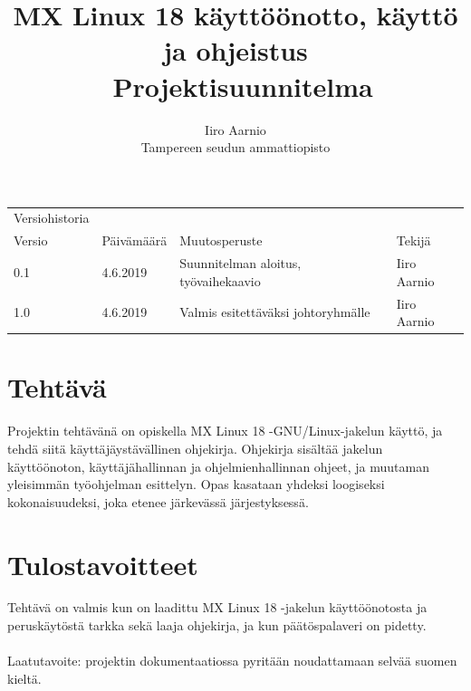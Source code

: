 \documentclass[a4paper, 12pt, finnish]{article}
\begin{document}
\title{MX Linux 18 käyttöönotto, käyttö ja ohjeistus \\ \large Projektisuunnitelma}
\author{Iiro Aarnio\\ Tampereen seudun ammattiopisto}
\maketitle
\thispagestyle{empty}
\newpage
\thispagestyle{empty}
\newpage
\begin{table}[htpb]
\begin{tabular}{llll}
Versiohistoria &            &                         &             \\
\rowcolor[HTML]{FFCCC9}
Versio         & Päivämäärä & Muutosperuste           & Tekijä      \\
0.1              & 4.6.2019   & Suunnitelman aloitus, työvaihekaavio       & Iiro Aarnio \\
1.0 & 4.6.2019 & Valmis esitettäväksi johtoryhmälle & Iiro Aarnio \\
\end{tabular}
\end{table}

\newpage
\thispagestyle{empty}
\tableofcontents
\newpage
\section{Tehtävä}
Projektin tehtävänä on opiskella MX Linux 18 -GNU/Linux-jakelun käyttö, ja tehdä siitä käyttäjäystävällinen ohjekirja. Ohjekirja sisältää jakelun käyttöönoton, käyttäjähallinnan ja ohjelmienhallinnan ohjeet, ja muutaman yleisimmän työohjelman esittelyn. Opas kasataan yhdeksi loogiseksi kokonaisuudeksi, joka etenee järkevässä järjestyksessä.

\section{Tulostavoitteet}
Tehtävä on valmis kun on laadittu MX Linux 18 -jakelun käyttöönotosta ja peruskäytöstä tarkka sekä laaja ohjekirja, ja kun päätöspalaveri on pidetty.
\\\\
Laatutavoite: projektin dokumentaatiossa pyritään noudattamaan selvää suomen kieltä.
\end{document}
